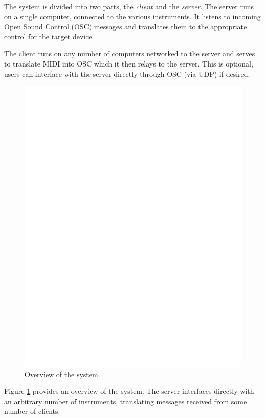 \documentclass[../main.tex]{subfiles}
\begin{document}
The system is divided into two parts, the {\em client} and the {\em server}. The server runs on a single computer, connected to the various instruments.  It listens to incoming Open Sound 
Control (OSC) messages and translates them to the appropriate control for the target device. 

The client runs on any number of computers networked to the server and serves to translate MIDI into OSC which it then relays to the server. This is optional, users
can interface with the server directly through OSC (via UDP) if desired.

\begin{figure}[htp]
	\centering
	\includegraphics[page=2]{./img/Diagram-specific.pdf}
	\caption{Overview of the system.}
	\label{fig:overview}
\end{figure}

Figure \ref{fig:overview} provides an overview of the system. The server interfaces directly with an arbitrary number of instruments, translating messages received from
some number of clients.
\end{document}
